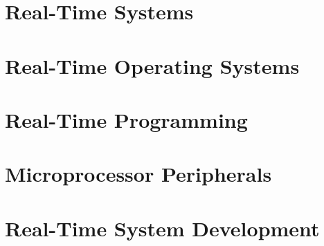 \chapter{Real-Time Systems}


\chapter{Real-Time Operating Systems}



\chapter{Real-Time Programming}


\chapter{Microprocessor Peripherals}


\chapter{Real-Time System Development}







